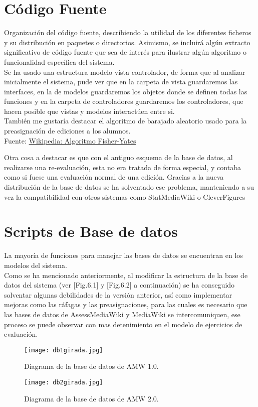 \section{Código Fuente}
Organización del código fuente, describiendo la utilidad de los diferentes ficheros y su distribución en paquetes o directorios. Asimismo, se incluirá algún extracto significativo de código fuente que sea de interés para ilustrar algún algoritmo o funcionalidad específica del sistema.\\

Se ha usado una estructura modelo vista controlador, de forma que al analizar inicialmente el sistema, pude ver que en la carpeta de vista guardaremos las interfaces, en la de modelos guardaremos los objetos donde se definen todas las funciones y en la carpeta de controladores guardaremos los controladores, que hacen posible que vistas y modelos interactúen entre si.\\

También me gustaría destacar el algoritmo de barajado aleatorio usado para la preasignación de ediciones a los alumnos.\\
Fuente: 
\href{https://es.wikipedia.org/wiki/Algoritmo_Fisher-Yates}{Wikipedia: Algoritmo Fisher-Yates}

Otra cosa a destacar es que con el antiguo esquema de la base de datos, al realizarse una re-evaluación, esta no era tratada de forma especial, y contaba como si fuese una evaluación normal de una edición.
Gracias a la nueva distribución de la base de datos se ha solventado ese problema, manteniendo a su vez la compatibilidad con otros sistemas como StatMediaWiki o CleverFigures

\section{Scripts de Base de datos}
La mayoría de funciones para manejar las bases de datos se encuentran en los modelos del sistema.\\

Como se ha mencionado anteriormente, al modificar la estructura de la base de datos del sistema (ver [Fig.6.1] y [Fig.6.2] a continuación) se ha conseguido solventar algunas debilidades de la versión anterior, así como implementar mejoras como las ráfagas y las preasignaciones, para las cuales es necesario que las bases de datos de AssessMediaWiki y MediaWiki se intercomuniquen, ese proceso se puede observar con mas detenimiento en el modelo de ejercicios de evaluación.

\clearpage

\begin{figure}
	\centering
	\texttt{[image: db1girada.jpg]}
	\caption{Diagrama de la base de datos de AMW 1.0.}
\end{figure}

\begin{figure}
	\centering
	\texttt{[image: db2girada.jpg]}
	\caption{Diagrama de la base de datos de AMW 2.0.}
\end{figure}

\clearpage